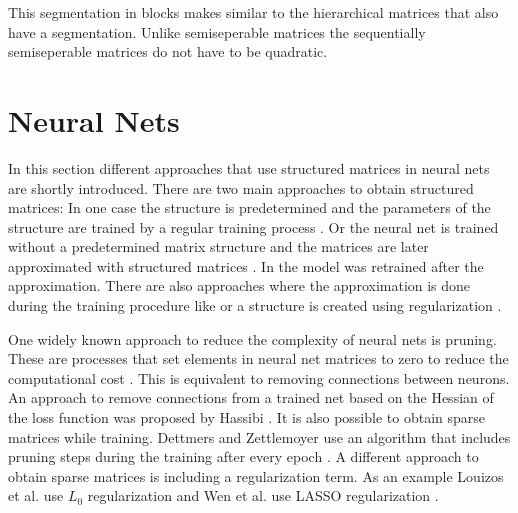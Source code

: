 \documentclass[doctype=mastersthesis,BCOR=15mm,biblatex]{ldvbook}%
\begin{document}
This segmentation in blocks makes similar to the hierarchical matrices that also have a segmentation.
Unlike semiseperable matrices the sequentially semiseperable matrices do not have to be quadratic. 

\section{Neural Nets}\label{sec:AI_weight}
In this section different approaches that use structured matrices in neural nets are shortly introduced.
There are two main approaches to obtain structured matrices:
In one case the structure is predetermined and the parameters of the structure are trained by a regular training process \cite{fan_multiscale_2019,dao_kaleidoscope_2020,li_butterfly_2015,ailon_sparse_2021,ioannou_training_2016}.
Or the neural net is trained without a predetermined matrix structure and the matrices are later approximated with structured matrices \cite{wu_hybrid_2020,hassibi_optimal_1993,jaderberg_speeding_2014,rigamonti_learning_2013}. In \cite{yu_compressing_2017} the model was retrained after the approximation. 
There are also approaches where the approximation is done during the training procedure like \cite{dettmers_sparse_2019} or a structure is created using regularization \cite{louizos_learning_2018,wen_learning_2016}.


One widely known approach to reduce the complexity of neural nets is pruning. 
These are processes that set elements in neural net matrices to zero to reduce the computational cost \cite{blalock_what_2020}.
This is equivalent to removing connections between neurons.
An approach to remove connections from a trained net based on the Hessian of the loss function was proposed by Hassibi \cite{hassibi_optimal_1993}.
It is also possible to obtain sparse matrices while training.
Dettmers and Zettlemoyer use an algorithm that includes pruning steps during the training after every epoch \cite{dettmers_sparse_2019}.
A different approach to obtain sparse matrices is including a regularization term.
As an example Louizos et al. use $L_0$ regularization  \cite{louizos_learning_2018} and Wen et al. use LASSO regularization \cite{wen_learning_2016}.
\end{document}
